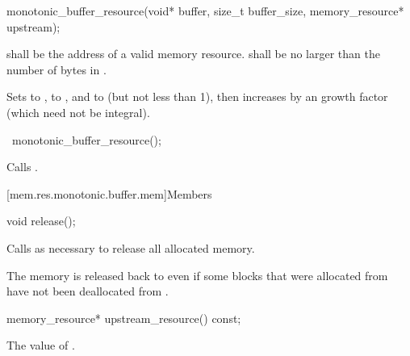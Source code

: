 %
\begin{itemdecl}
monotonic_buffer_resource(void* buffer, size_t buffer_size, memory_resource* upstream);
\end{itemdecl}

\begin{itemdescr}
\pnum
\requires
{} shall be the address of a valid memory resource.
 shall be no larger than the number of bytes in .

\pnum
\effects
Sets  to ,
 to , and
 to  (but not less than 1),
then increases 
by an  growth factor (which need not be integral).
\end{itemdescr}

%
\begin{itemdecl}
~monotonic_buffer_resource();
\end{itemdecl}

\begin{itemdescr}
\pnum
\effects
Calls .
\end{itemdescr}


[mem.res.monotonic.buffer.mem]{Members}

%
\begin{itemdecl}
void release();
\end{itemdecl}

\begin{itemdescr}
\pnum
\effects
Calls  as necessary
to release all allocated memory.

\pnum
\begin{note}
The memory is released back to 
even if some blocks that were allocated from 
have not been deallocated from .
\end{note}
\end{itemdescr}

%
\begin{itemdecl}
memory_resource* upstream_resource() const;
\end{itemdecl}

\begin{itemdescr}
\pnum
\returns
The value of .
\end{itemdescr}

